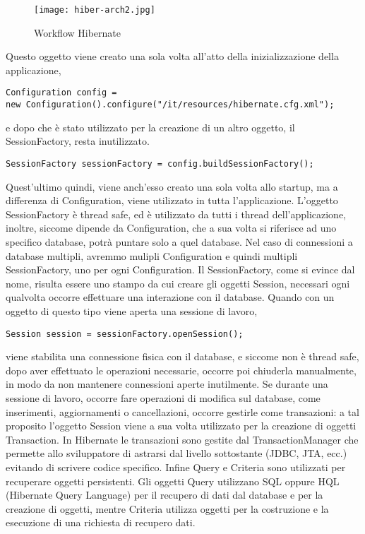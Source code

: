 \FloatBarrier
\begin{figure}[!htb]
\centering%
\texttt{[image: hiber-arch2.jpg]}%
\caption{Workflow Hibernate}\label{fig:hibernate2}%
\end{figure}

Questo oggetto viene creato una sola volta all'atto della inizializzazione della applicazione,

\begin{lstlisting}
Configuration config = 
new Configuration().configure("/it/resources/hibernate.cfg.xml");
\end{lstlisting}

e dopo che \`e stato utilizzato per la creazione di un altro oggetto, il SessionFactory, resta inutilizzato.

\begin{lstlisting}
SessionFactory sessionFactory = config.buildSessionFactory();
\end{lstlisting}

Quest'ultimo quindi, viene anch'esso creato una sola volta allo startup, ma a differenza di Configuration, viene utilizzato in tutta l'applicazione. L'oggetto SessionFactory \`e thread safe, ed \`e utilizzato da tutti i thread dell'applicazione, inoltre, siccome dipende da Configuration, che a sua volta si riferisce ad uno specifico database, potr\`a puntare solo a quel database. Nel caso di connessioni a database multipli, avremmo mulipli Configuration e quindi multipli SessionFactory, uno per ogni Configuration.
Il SessionFactory, come si evince dal nome, risulta essere uno stampo da cui creare gli oggetti Session, necessari ogni qualvolta occorre effettuare una interazione con il database. Quando con un oggetto di questo tipo viene aperta una sessione di lavoro,

\begin{lstlisting}
Session session = sessionFactory.openSession();
\end{lstlisting}

viene stabilita una connessione fisica con il database, e siccome non \`e thread safe, dopo aver effettuato le operazioni necessarie, occorre poi chiuderla manualmente, in modo da non mantenere connessioni aperte inutilmente.
Se durante una sessione di lavoro, occorre fare operazioni di modifica sul database, come inserimenti, aggiornamenti o cancellazioni, occorre gestirle come transazioni: a tal proposito l'oggetto Session viene a sua volta utilizzato per la creazione di oggetti Transaction. 
In Hibernate le transazioni sono gestite dal TransactionManager che permette allo sviluppatore di astrarsi dal livello sottostante (JDBC, JTA, ecc.) evitando di scrivere codice specifico. Infine Query e Criteria sono utilizzati per recuperare oggetti persistenti. Gli oggetti Query utilizzano SQL oppure HQL (Hibernate Query Language) per il recupero di dati dal database e per la creazione di oggetti, mentre Criteria utilizza oggetti per la costruzione e la esecuzione di una richiesta di recupero dati. 
